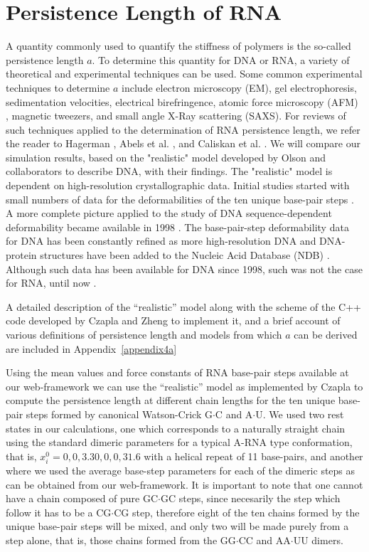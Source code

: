 \section{Persistence Length of RNA}
A quantity commonly used to  quantify the stiffness of polymers is the
so-called persistence  length $a$. To determine this  quantity for DNA
or RNA,  a variety of  theoretical and experimental techniques  can be
used.  Some  common experimental  techniques to determine  $a$ include
electron   microscopy   (EM),   gel   electrophoresis,   sedimentation
velocities, electrical birefringence,  atomic force microscopy (AFM) ,
magnetic  tweezers,  and small  angle  X-Ray  scattering (SAXS).   For
reviews  of  such  techniques  applied  to the  determination  of  RNA
persistence    length,    we   refer    the    reader   to    Hagerman
\cite{hagerman1997}, Abels  et al.  \cite{abels2005},  and Caliskan et
al.   \cite{caliskan2005}.  We  will compare  our  simulation results,
based on  the "realistic" model  developed by Olson  and collaborators
\cite{olson1995} to describe DNA, with their findings. The "realistic"
model is dependent  on high-resolution crystallographic data.  Initial
studies started with small numbers  of data for the deformabilities of
the  ten unique  base-pair  steps \cite{olson1995}.   A more  complete
picture applied  to the study of DNA  sequence-dependent deformability
became  available   in  1998  \cite{olson1998}.    The  base-pair-step
deformability  data  for  DNA  has  been constantly  refined  as  more
high-resolution DNA and DNA-protein  structures have been added to the
Nucleic Acid Database (NDB) \cite{balasubramanian2009}.  Although such
data has been available for DNA  since 1998, such was not the case for
RNA, until now \cite{olson2009}.

A detailed description of the  ``realistic'' model along with the scheme
of the C++  code developed by Czapla and Zheng to  implement it, and a
brief account of various  definitions of persistence length and models
from which $a$ can be derived are included in Appendix~\ref{appendix4a}

Using  the mean  values and  force  constants of  RNA base-pair  steps
available at our  web-framework we can use the  ``realistic'' model as
implemented by  Czapla to compute the persistence  length at different
chain lengths for  the ten unique base-pair steps  formed by canonical
Watson-Crick G$\cdot$C and  A$\cdot$U. We used two rest  states in our
calculations,  one which  corresponds  to a  naturally straight  chain
using  the  standard  dimeric  parameters  for a  typical  A-RNA  type
conformation, that is,  $x_{i}^{0} = {0, 0, 3.30, 0,  0, 31.6}$ with a
helical repeat of 11 base-pairs, and another where we used the average
base-step parameters for each of  the dimeric steps as can be obtained
from our web-framework. It is important to note that one cannot have a
chain composed  of pure GC$\cdot$GC  steps, since necesarily  the step
which follow it  has to be a CG$\cdot$CG step,  therefore eight of the
ten chains  formed by  the unique base-pair  steps will be  mixed, and
only two will be made purely  from a step alone, that is, those chains
formed from the GG$\cdot$CC and AA$\cdot$UU dimers.

